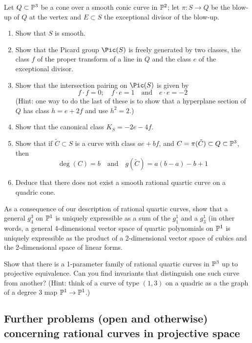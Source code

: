 \begin{exercise}\label{F2}
Let $Q \subset \PP^3$ be a cone over a smooth conic curve in $\PP^2$; let $\pi : S \to Q$ be the blow-up of $Q$ at the vertex and $E \subset S$ the exceptional divisor of the blow-up.
\begin{enumerate}
\item Show that $S$ is smooth.
\item Show that the Picard group $\Pic(S)$ is freely generated by two classes, the class $f$ of the proper transform of a line in $Q$ and the class $e$ of the exceptional divisor.
\item Show that the intersection pairing on $\Pic(S)$ is given by
$$
f \cdot f = 0; \quad f \cdot e = 1 \quad \text{and} \quad e \cdot e = -2
$$
(Hint: one way to do the last of these is to show that a hyperplane section of $Q$ has class $h = e + 2f$ and use $h^2 = 2$.)
\item Show that the canonical class $K_S = -2e-4f$.
\item Show that if $\tilde C \subset S$ is a curve with class $ae + bf$, and
$C = \pi(\tilde C) \subset Q \subset \PP^3$, then
$$
\deg(C) = b \quad \text{and} \quad g(\tilde C) = a(b-a) -b +1
$$
\item Deduce that there does not exist a smooth rational quartic curve on a quadric cone.
\end{enumerate}
\end{exercise}

\begin{exercise}
As a consequence of our description of rational quartic curves, show that a general $g^3_4$ on $\PP^1$ is uniquely expressible as a sum of the $g_1^1$ and a $g^1_3$
(in other words, a general 4-dimensional vector space of quartic polynomials on $\PP^1$ is uniquely expressible as the product of a 2-dimensional vector space of cubics and the 2-dimensional space of linear forms.
\end{exercise}

\begin{exercise}
Show that there is a 1-parameter family of rational quartic curves in $\PP^3$ up to projective equivalence. Can you find invariants that distinguish one such curve from another? (Hint: think of a curve of type $(1,3)$ on a quadric as a the graph of a degree 3 map $\PP^1 \to \PP^1$.)
\end{exercise}

\subsection{Further problems (open and otherwise) concerning rational curves in projective space}

